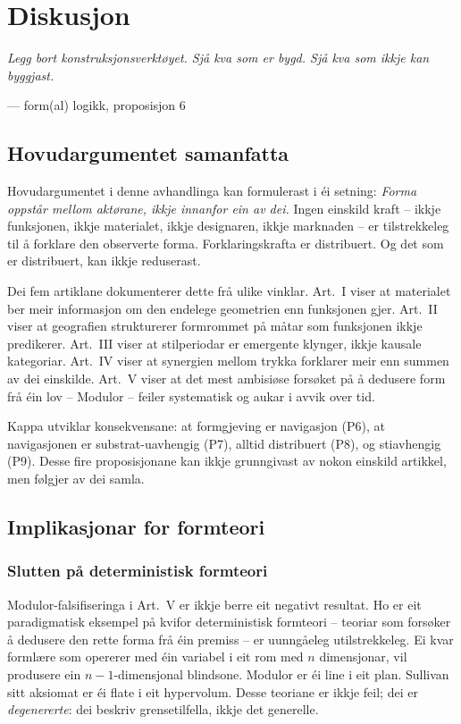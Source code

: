 \documentclass[12pt,a4paper,oneside]{report}
\begin{document}
\chapter{Diskusjon}
\label{ch:diskusjon}

\epigraph{\itshape Legg bort konstruksjonsverktøyet. Sjå kva som er bygd. Sjå kva som ikkje kan byggjast.}{--- form(al) logikk, proposisjon 6}

\section{Hovudargumentet samanfatta}

Hovudargumentet i denne avhandlinga kan formulerast i éi setning: \emph{Forma oppstår mellom aktørane, ikkje innanfor ein av dei.} Ingen einskild kraft -- ikkje funksjonen, ikkje materialet, ikkje designaren, ikkje marknaden -- er tilstrekkeleg til å forklare den observerte forma. Forklaringskrafta er distribuert. Og det som er distribuert, kan ikkje reduserast.

Dei fem artiklane dokumenterer dette frå ulike vinklar. Art.~I viser at materialet ber meir informasjon om den endelege geometrien enn funksjonen gjer. Art.~II viser at geografien strukturerer formrommet på måtar som funksjonen ikkje predikerer. Art.~III viser at stilperiodar er emergente klynger, ikkje kausale kategoriar. Art.~IV viser at synergien mellom trykka forklarer meir enn summen av dei einskilde. Art.~V viser at det mest ambisiøse forsøket på å dedusere form frå éin lov -- Modulor -- feiler systematisk og aukar i avvik over tid.

Kappa utviklar konsekvensane: at formgjeving er navigasjon (P6), at navigasjonen er substrat-uavhengig (P7), alltid distribuert (P8), og stiavhengig (P9). Desse fire proposisjonane kan ikkje grunngivast av nokon einskild artikkel, men følgjer av dei samla.

\section{Implikasjonar for formteori}

\subsection{Slutten på deterministisk formteori}

Modulor-falsifiseringa i Art.~V er ikkje berre eit negativt resultat. Ho er eit paradigmatisk eksempel på kvifor deterministisk formteori -- teoriar som forsøker å dedusere den rette forma frå éin premiss -- er uunngåeleg utilstrekkeleg. Ei kvar formlære som opererer med éin variabel i eit rom med $n$ dimensjonar, vil produsere ein $n-1$-dimensjonal blindsone. Modulor er éi line i eit plan. Sullivan sitt aksiomat er éi flate i eit hypervolum. Desse teoriane er ikkje feil; dei er \emph{degenererte}: dei beskriv grensetilfella, ikkje det generelle.
\end{document}
